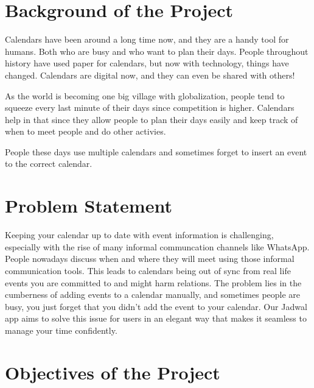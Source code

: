 \documentclass[12pt,a4paper]{report}
\begin{document}
\section{Background of the Project}

 Calendars have been around a long time now, and they are a handy tool for humans. Both who are busy and who want to plan their days. People throughout history have used paper for calendars, but now with technology, things have changed. Calendars are digital now, and they can even be shared with others!

As the world is becoming one big village with globalization, people tend to squeeze every last minute of their days since competition is higher. Calendars help in that since they allow people to plan their days easily and keep track of when to meet people and do other activies.

People these days use multiple calendars and sometimes forget to insert an event to the correct calendar.
\section{Problem Statement}

Keeping your calendar up to date with event information is challenging, especially with the rise of many informal communcation channels like WhatsApp. People nowadays discuss when and where they will meet using those informal communication tools. This leads to calendars being out of sync from real life events you are committed to and might harm relations. The problem lies in the cumberness of adding events to a calendar manually, and sometimes people are busy, you just forget that you didn't add the event to your calendar. Our Jadwal app aims to solve this issue for users in an elegant way that makes it seamless to manage your time confidently.

\section{Objectives of the Project}
\end{document}
